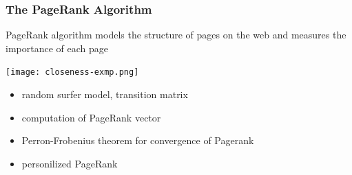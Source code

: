 \documentclass[titlepage,german,presentation]{beamer}
\begin{document}
\begin{frame}
\frametitle{The PageRank Algorithm}
\begin{block}{}
  PageRank algorithm models the structure of pages on the web and measures the importance of each page
\end{block}
\begin{center}
\texttt{[image: closeness-exmp.png]}\qquad \qquad
\end{center}
\begin{itemize}
\item random surfer model, transition matrix~\cite{Brin98}
\item computation of PageRank vector~\cite{Brin98} %
\item Perron-Frobenius theorem for convergence of Pagerank
\item personilized PageRank~\cite{Jen03}
\end{itemize}

\end{frame}




\end{document}
